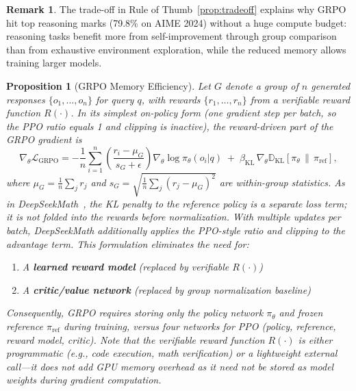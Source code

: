 \documentclass[12pt,a4paper]{report}
\newtheorem{proposition}[theorem]{Proposition}
\theoremstyle{definition}
\newtheorem{remark}[theorem]{Remark}
\begin{document}
\begin{remark}
The trade-off in Rule of Thumb~\ref{prop:tradeoff} explains why GRPO hit top reasoning marks (79.8\% on AIME 2024) without a huge compute budget: reasoning tasks benefit more from self-improvement through group comparison than from exhaustive environment exploration, while the reduced memory allows training larger models.
\end{remark}

\begin{proposition}[GRPO Memory Efficiency]
\label{prop:grpo_memory}
Let $G$ denote a group of $n$ generated responses $\{o_1, \ldots, o_n\}$ for query $q$, with rewards $\{r_1, \ldots, r_n\}$ from a verifiable reward function $R(\cdot)$. In its simplest on-policy form (one gradient step per batch, so the PPO ratio equals 1 and clipping is inactive), the reward-driven part of the GRPO gradient is
\begin{equation}
\nabla_\theta \mathcal{L}_{\text{GRPO}} = -\frac{1}{n} \sum_{i=1}^{n} \left( \frac{r_i - \mu_G}{s_G + \epsilon} \right) \nabla_\theta \log \pi_\theta(o_i | q) \;+\; \beta_{\text{KL}}\, \nabla_\theta \mathbb{D}_{\text{KL}}\!\left[\pi_\theta \,\|\, \pi_{\text{ref}}\right],
\end{equation}
where $\mu_G = \frac{1}{n}\sum_j r_j$ and $s_G = \sqrt{\frac{1}{n}\sum_j (r_j - \mu_G)^2}$ are within-group statistics. As in DeepSeekMath~\cite{shao2024deepseekmath}, the KL penalty to the reference policy is a separate loss term; it is not folded into the rewards before normalization. With multiple updates per batch, DeepSeekMath additionally applies the PPO-style ratio and clipping to the advantage term. This formulation eliminates the need for:
\begin{enumerate}
    \item A \textbf{learned reward model} (replaced by verifiable $R(\cdot)$)
    \item A \textbf{critic/value network} (replaced by group normalization baseline)
\end{enumerate}
Consequently, GRPO requires storing only the policy network $\pi_\theta$ and frozen reference $\pi_{\text{ref}}$ during training, versus four networks for PPO (policy, reference, reward model, critic). Note that the verifiable reward function $R(\cdot)$ is either programmatic (e.g., code execution, math verification) or a lightweight external call---it does not add GPU memory overhead as it need not be stored as model weights during gradient computation.
\end{proposition}
\end{document}
